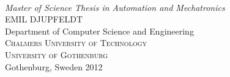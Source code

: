 \begin{titlepage}

\mbox{}
\vfill
\addtolength{\voffset}{2cm}
\begin{flushleft}
	{ \\[0.5cm]
	\emph{\Large Master of Science Thesis in Automation and Mechatronics} \\[.8cm]
	
	{\huge EMIL DJUPFELDT}\\[.8cm]
	
	{\Large Department of Computer Science and Engineering\\
	\textsc{Chalmers University of Technology} \\
	\textsc{University of Gothenburg} \\
	Gothenburg, Sweden 2012 \\
	} 
	}
\end{flushleft}

\end{titlepage}
\ClearShipoutPicture


